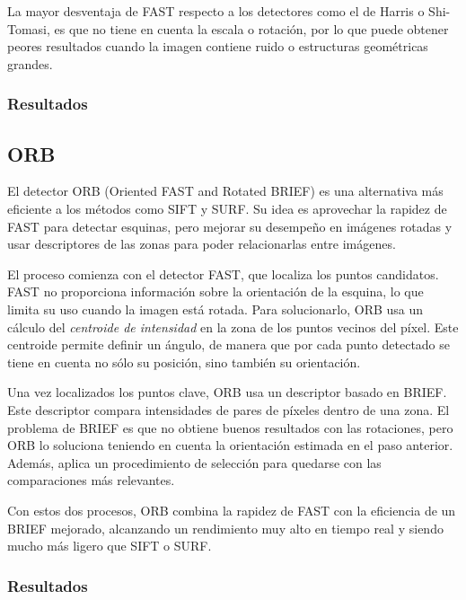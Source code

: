 La mayor desventaja de FAST respecto a los detectores como el de Harris o Shi-Tomasi, es que no tiene en cuenta la escala o rotación, por lo que puede obtener peores resultados cuando la imagen contiene ruido o estructuras geométricas grandes.

\subsubsection{Resultados}


\subsection{ORB}

El detector ORB (Oriented FAST and Rotated BRIEF) \cite{rublee2011orb} es una alternativa más eficiente a los métodos como SIFT y SURF. Su idea es aprovechar la rapidez de FAST para detectar esquinas, pero mejorar su desempeño en imágenes rotadas y usar descriptores de las zonas para poder relacionarlas entre imágenes.

El proceso comienza con el detector FAST, que localiza los puntos candidatos. FAST no proporciona información sobre la orientación de la esquina, lo que limita su uso cuando la imagen está rotada. Para solucionarlo, ORB usa un cálculo del \emph{centroide de intensidad} en la zona de los puntos vecinos del píxel. Este centroide permite definir un ángulo, de manera que por cada punto detectado se tiene en cuenta no sólo su posición, sino también su orientación.

Una vez localizados los puntos clave, ORB usa un descriptor basado en BRIEF. Este descriptor compara intensidades de pares de píxeles dentro de una zona. El problema de BRIEF es que no obtiene buenos resultados con las rotaciones, pero ORB lo soluciona teniendo en cuenta la orientación estimada en el paso anterior. Además, aplica un procedimiento de selección para quedarse con las comparaciones más relevantes. 

Con estos dos procesos, ORB combina la rapidez de FAST con la eficiencia de un BRIEF mejorado, alcanzando un rendimiento muy alto en tiempo real y siendo mucho más ligero que SIFT o SURF.


\subsubsection{Resultados}

